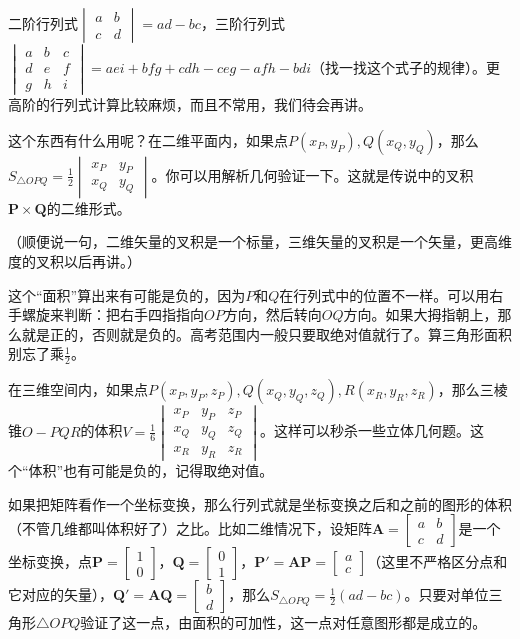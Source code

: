 二阶行列式$\begin{vmatrix}
a & b \\
c & d
\end{vmatrix}=a d-b c$，三阶行列式$\begin{vmatrix}
a & b & c \\
d & e & f \\
g & h & i
\end{vmatrix}=a e i+b f g+c d h-c e g-a f h-b d i$（找一找这个式子的规律）。更高阶的行列式计算比较麻烦，而且不常用，我们待会再讲。

这个东西有什么用呢？在二维平面内，如果点$P(x_P, y_P), Q(x_Q, y_Q)$，那么$S_{\triangle O P Q}=\frac{1}{2}\begin{vmatrix}
x_P & y_P \\
x_Q & y_Q
\end{vmatrix}$。你可以用解析几何验证一下。这就是传说中的叉积$\mathbf{P} \times \mathbf{Q}$的二维形式。

（顺便说一句，二维矢量的叉积是一个标量，三维矢量的叉积是一个矢量，更高维度的叉积以后再讲。）

这个“面积”算出来有可能是负的，因为$P$和$Q$在行列式中的位置不一样。可以用右手螺旋来判断：把右手四指指向$O P$方向，然后转向$O Q$方向。如果大拇指朝上，那么就是正的，否则就是负的。高考范围内一般只要取绝对值就行了。算三角形面积别忘了乘$\frac{1}{2}$。

在三维空间内，如果点$P(x_P, y_P, z_P), Q(x_Q, y_Q, z_Q), R(x_R, y_R, z_R)$，那么三棱锥$O-P Q R$的体积$V=\frac{1}{6}\begin{vmatrix}
x_P & y_P & z_P \\
x_Q & y_Q & z_Q \\
x_R & y_R & z_R
\end{vmatrix}$。这样可以秒杀一些立体几何题。这个“体积”也有可能是负的，记得取绝对值。

如果把矩阵看作一个坐标变换，那么行列式就是坐标变换之后和之前的图形的体积（不管几维都叫体积好了）之比。比如二维情况下，设矩阵$\mathbf{A}=\begin{bmatrix}
a & b \\
c & d
\end{bmatrix}$是一个坐标变换，点$\mathbf{P}=\begin{bmatrix} 1 \\ 0 \end{bmatrix}$，$\mathbf{Q}=\begin{bmatrix} 0 \\ 1 \end{bmatrix}$，$\mathbf{P'}=\mathbf{A} \mathbf{P}=\begin{bmatrix} a \\ c \end{bmatrix}$（这里不严格区分点和它对应的矢量），$\mathbf{Q'}=\mathbf{A} \mathbf{Q}=\begin{bmatrix} b \\ d \end{bmatrix}$，那么$S_{\triangle O P Q}=\frac{1}{2}(a d-b c)$。只要对单位三角形$\triangle O P Q$验证了这一点，由面积的可加性，这一点对任意图形都是成立的。

